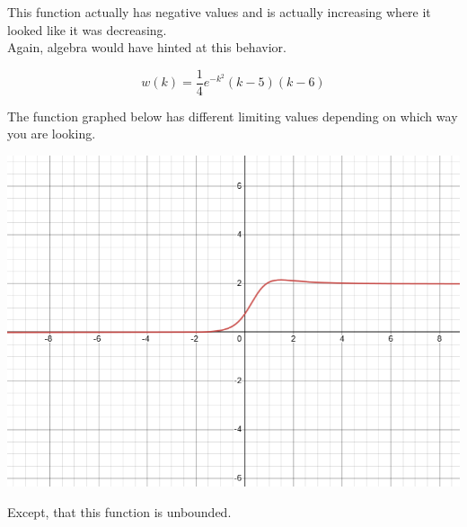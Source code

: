 \documentclass{ximera}
\begin{document}
\begin{example}
This function actually has negative values and is actually increasing where it looked like it was decreasing. \\


Again, algebra would have hinted at this behavior.

\[  w(k) = \frac{1}{4} e^{-k^2} (k-5)(k-6)     \]


\end{example}







\newpage


\begin{example}


The function graphed below has different limiting values depending on which way you are looking.

\begin{image}
\includegraphics{pics/graph_4A.png}
\end{image}




Except, that this function is unbounded.


\end{example}
\end{document}

